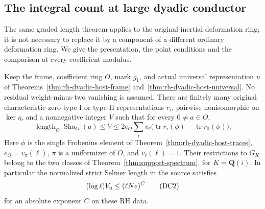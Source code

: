 \subsection{The integral count at large dyadic conductor}
\label{sec:rh-dyadic-host-count}

The same graded length theorem applies to the original inertial
deformation ring; it is not necessary to replace it by a component
of a different ordinary deformation ring. We give the presentation,
the point conditions and the comparison at every coefficient modulus.

\begin{theorem}
\label{thm:rh-dyadic-host-count}
Keep the frame, coefficient ring $O$, mark $g_1$, and actual
universal representation $u$ of
Theorems~\ref{thm:rh-dyadic-host-frame}
and~\ref{thm:rh-dyadic-host-universal}.
No residual weight-minus-two vanishing is assumed.
There are finitely many original characteristic-zero type-I or
type-II representations $r_i$, pairwise nonisomorphic on $\ker\eta$,
and a nonnegative integer $V$ such that for every $0\ne a\in O$,
\[
 \operatorname{length}_O\operatorname{Sha}_O(a)
 \le V\le 2e_O\sum_i
 v_\ell\bigl(\operatorname{tr}r_i(\phi)
                 -\operatorname{tr}r_0(\phi)\bigr).
 \tag{DC1}
\]
Here $\phi$ is the single Frobenius element of
Theorem~\ref{thm:rh-dyadic-host-traces}, $e_O=v_\pi(\ell)$,
$\pi$ is a uniformizer of $O$, and $v_\ell(\ell)=1$.
Their restrictions to $G_K$ belong to the two classes of
Theorem~\ref{thm:support-spectrum}, for $K=\mathbf Q(i)$.
In particular the normalized strict Selmer length in the source
satisfies
\[
       (\log\ell)V_{\rm n}\le(\ell Ne)^C                         \tag{DC2}
\]
for an absolute exponent $C$ on these RH data.
\end{theorem}


